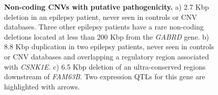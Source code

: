 \begin{figure}[htp]
  \centering
  \begin{subfigure}[b]{\textwidth}
    \caption{}
    \label{fig:ncepiexdel}
  \end{subfigure}
  \begin{subfigure}[b]{\textwidth}
    \caption{}
    \label{fig:ncepiex1}
  \end{subfigure}
  \begin{subfigure}[b]{\textwidth}
    \caption{}
    \label{fig:ncepiex2}
  \end{subfigure}

  \caption[Non-coding CNVs with putative pathogenicity.]{{\bf Non-coding CNVs with putative pathogenicity.} {\small a) 2.7 Kbp deletion in an epilepsy patient, never seen in controls or CNV databases. Three other epilepsy patients have a rare non-coding deletions located at less than 200 Kbp from the {\it GABRD} gene. b) 8.8 Kbp duplication in two epilepsy patients, never seen in controls or CNV databases and overlapping a regulatory region associated with {\it CSNK1E}. c) 6.5 Kbp deletion of an ultra-conserved regions downstream of {\it FAM63B}. Two expression QTLs for this gene are highlighted with arrows.}}
\end{figure}

